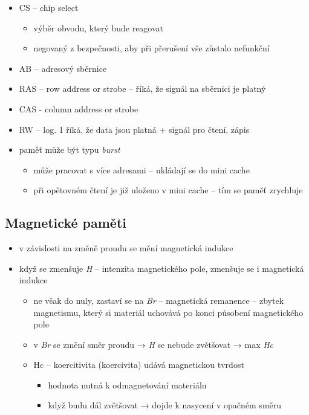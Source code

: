 \documentclass[a4paper,12pt]{article}
\providecommand{\tightlist}{%
\setlength{\itemsep}{0pt}\setlength{\parskip}{0pt}}
\begin{document}
\begin{itemize}
\tightlist
\item CS -- chip select
  \begin{itemize}
  \tightlist
  \item výběr obvodu, který bude reagovat
  \item negovaný z bezpečnosti, aby při přerušení vše zůstalo nefunkční
  \end{itemize}
\item AB -- adresový sběrnice
\item RAS -- row address or strobe -- říká, že signál na sběrnici je platný
\item CAS - column address or strobe
\item RW -- log. 1 říká, že data jsou platná + signál pro čtení, zápis
\item paměť může být typu \emph{burst}

  \begin{itemize}
  \tightlist
  \item může pracovat s více adresami -- ukládají se do mini cache
  \item při opětovném čtení je již uloženo v mini cache -- tím se paměť
    zrychluje
  \end{itemize}
\end{itemize}

\subsection{Magnetické paměti}

\begin{itemize}
\tightlist
\item v závislosti na změně proudu se mění magnetická indukce
\item když se zmenšuje \emph{H} -- intenzita magnetického pole, zmenšuje se
  i magnetická indukce

  \begin{itemize}
    \tightlist
  \item ne však do nuly, zastaví se na \emph{Br} -- magnetická remanence --
    zbytek magnetismu, který si materiál uchovává po konci působení
    magnetického pole
  \item v \emph{Br} se změní směr proudu → \emph{H} se nebude zvětšovat →
    max \emph{Hc}
  \item Hc -- koercitivita (koercivita) udává magnetickou tvrdost

    \begin{itemize}
    \tightlist
    \item hodnota nutná k odmagnetování materiálu
    \item když budu dál zvětšovat → dojde k nasycení v opačném směru
    \end{itemize}
  \end{itemize}
\end{itemize}
\end{document}
